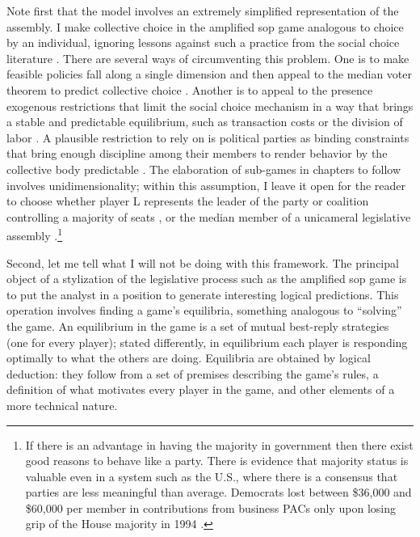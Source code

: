 Note first that the model involves an extremely simplified representation of the assembly.  I make collective choice in the amplified sop game analogous to choice by an individual, ignoring lessons against such a practice from the social choice literature \citep{plott.1967,mckelvey.1976,schofield.1983,riker.1980}. There are several ways of circumventing this problem.  One is to make feasible policies fall along a single dimension and then appeal to the median voter theorem to predict collective choice \citep{black.1958,tsebelis.money.1997}.  Another is to appeal to the presence exogenous restrictions that limit the social choice mechanism in a way that brings a stable and predictable equilibrium, such as transaction costs \citep{sloss.1973,lupia.mccubbins.1997} or the division of labor \citep{shepsle.1979}.  A plausible restriction to rely on is political parties as binding constraints that bring enough discipline among their members to render behavior by the collective body predictable \citep{cox.mccubbins.1994}. The elaboration of sub-games in chapters to follow involves unidimensionality; within this assumption, I leave it open for the reader to choose whether player L represents the leader of the party or coalition controlling a majority of seats \citep{cox.mccubbins.2005}, or the median member of a unicameral legislative assembly \citep{krehbiel.1998}.\footnote{If there is an advantage in having the majority in government then there exist good reasons to behave like a party.  There is evidence that majority status is valuable even in a system such as the U.S., where there is a consensus that parties are less meaningful than average.  Democrats lost between \$36,000 and \$60,000 per member in contributions from business PACs only upon losing grip of the House majority in 1994 \citep{cox.magar.1999,cox.magar.nd}.}

Second, let me tell what I will not be doing with this framework.  The principal object of a stylization of the legislative process such as the amplified sop game is to put the analyst in a position to generate interesting logical predictions.  This operation involves finding a game’s equilibria, something analogous to “solving” the game.  An equilibrium in the game is a set of mutual best-reply strategies (one for every player); stated differently, in equilibrium each player is responding optimally to what the others are doing.  Equilibria are obtained by logical deduction: they follow from a set of premises describing the game’s rules, a definition of what motivates every player in the game, and other elements of a more technical nature.  

